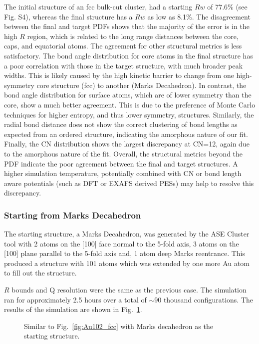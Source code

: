 The initial structure of an fcc bulk-cut cluster, had a starting $Rw$ of 77.6\% (see Fig. S4), whereas the final structure has a $Rw$ as low as 8.1\%.
The disagreement between the final and target PDFs shows that the majority of the error is in the high $R$ region, which is related to the long range distances between the core, caps, and equatorial atoms.
The agreement for other structural metrics is less satisfactory. The bond angle distribution for core atoms in the final structure has a poor correlation with those in the target structure, with much broader peak widths.
This is likely caused by the high kinetic barrier to change from one high-symmetry core structure (fcc) to another (Marks Decahedron). In contrast,
the bond angle distribution for surface atoms, which are of lower symmetry than the core, show a much better agreement.
This is due to the preference of Monte Carlo techniques for higher entropy, and thus lower symmetry, structures.
Similarly, the radial bond distance does not show the correct clustering of bond lengths as expected from an ordered structure, indicating the amorphous nature of our fit.
Finally, the CN distribution shows the largest discrepancy at CN=12, again due to the amorphous nature of the fit. Overall, the structural metrics beyond the PDF indicate the poor agreement between the final and target structures.
A higher simulation temperature, potentially combined with CN or bond length aware potentials (such as DFT or EXAFS derived PESs) may help to resolve this discrepancy.

\subsubsection{Starting from Marks Decahedron}
The starting structure, a Marks Decahedron, was generated by the ASE Cluster tool with 2  atoms on the [100] face normal to the 5-fold axis, 3 atoms on the [100] plane parallel to the 5-fold axis and, 1 atom deep Marks reentrance.  This produced a structure with 101 atoms which was extended by one more Au atom to fill out the  structure.

$R$ bounds and Q resolution were the same as the previous case. The simulation ran for approximately 2.5 hours over a total of $\sim$90 thousand configurations.  The results of the simulation are shown in Fig.~\ref{fig:Au102_deca}.

\begin{figure}
  \def \localimgpath {Au_102__deca_HMC_paper_final/55db6901d2d3552df4f6c86f}
  \captionsetup[subfigure]{labelformat=simple}
  \centering
    \quad
    \quad
    \quad
    \quad
    \quad
    \quad

  \caption{Similar to Fig.~\ref{fig:Au102_fcc} with Marks decahedron as the starting structure.}
  \label{fig:Au102_deca}
\end{figure}

